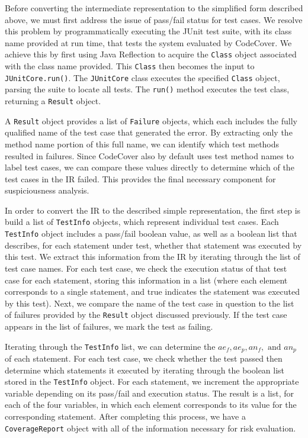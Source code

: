 Before converting the intermediate representation to the simplified form described above, we must
first address the issue of pass/fail status for test cases.  We resolve this problem by 
programmatically executing the JUnit test suite, with its class name provided at run time, that 
tests the system evaluated by CodeCover.  We achieve this by first using Java Reflection to 
acquire the \texttt{Class} object associated with the class name provided.  This \texttt{Class} then
becomes the input to \texttt{JUnitCore.run()}.  The \texttt{JUnitCore} class executes the
specified \texttt{Class} object, parsing the suite to locate all tests.  The \texttt{run()} 
method executes the test class, returning a \texttt{Result} object.

A \texttt{Result} object provides a list of \texttt{Failure} objects, which each includes the
fully qualified name of the test case that generated the error.  By extracting only the method
name portion of this full name, we can identify which test methods resulted in failures.  Since
CodeCover also by default uses test method names to label test cases, we can compare these values
directly to determine which of the test cases in the IR failed.  This provides the final necessary 
component for suspiciousness analysis.

In order to convert the IR to the described simple representation, the first step is build
a list of \texttt{TestInfo} objects, which represent individual test cases.  Each \texttt{TestInfo}
object includes a pass/fail boolean value, as well as a boolean list that describes, for each
statement under test, whether that statement was executed by this test.  We extract this information 
from the IR by iterating through the list of test case names.  For each test case, we check the
execution status of that test case for each statement, storing this information in a list (where
each element corresponds to a single statement, and true indicates the statement was executed by this
test).  Next, we compare the name of the test case in question to the list of failures provided
by the \texttt{Result} object discussed previously.  If the test case appears in the list of failures,
we mark the test as failing.

Iterating through the \texttt{TestInfo} list, we can determine the $ae_f, ae_p, an_f, \text{ and } an_p$
of each statement.  For each test case, we check whether the test passed then determine which statements
it executed by iterating through the boolean list stored in the \texttt{TestInfo} object.  For each
statement, we increment the appropriate variable depending on its pass/fail and execution status.  The
result is a list, for each of the four variables, in which each element corresponds to its value for
the corresponding statement.  After completing this process, we have a \texttt{CoverageReport} object
with all of the information necessary for risk evaluation.

